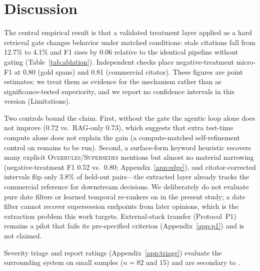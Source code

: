 \section{Discussion}
\label{sec:discussion}

The central empirical result is that a validated treatment layer applied as a hard retrieval gate changes \plre{} behavior under matched conditions: stale citations fall from 12.7\% to 4.1\% and F1 rises by 0.06 relative to the identical pipeline without gating (Table~\ref{tab:ablation}).
Independent checks place negative-treatment micro-F1 at 0.80 (gold spans) and 0.81 (commercial citator).
These figures are point estimates; we treat them as evidence for the mechanism rather than as significance-tested superiority, and we report no confidence intervals in this version (Limitations).

Two controls bound the claim.
First, without the gate the agentic loop alone does not improve \plre{} (0.72 vs.\ RAG-only 0.73), which suggests that extra test-time compute alone does not explain the gain (a compute-matched self-refinement control on \plre{} remains to be run).
Second, a surface-form keyword heuristic recovers many explicit \textsc{Overrules}/\textsc{Supersedes} mentions but almost no material narrowing (negative-treatment F1 0.52 vs.\ 0.80; Appendix~\ref{app:edge}), and citator-corrected intervals flip only 3.8\% of held-out pairs---the extracted layer already tracks the commercial reference for downstream decisions.
We deliberately do not evaluate pure date filters or learned temporal re-rankers on \plre{} in the present study; a date filter cannot recover supersession endpoints from later opinions, which is the extraction problem this work targets.
External-stack transfer (Protocol~P1) remains a pilot that fails its pre-specified criterion (Appendix~\ref{app:p1}) and is not claimed.

Severity triage and report ratings (Appendix~\ref{app:triage}) evaluate the surrounding system on small samples ($n = 82$ and 15) and are secondary to \plre{}.

